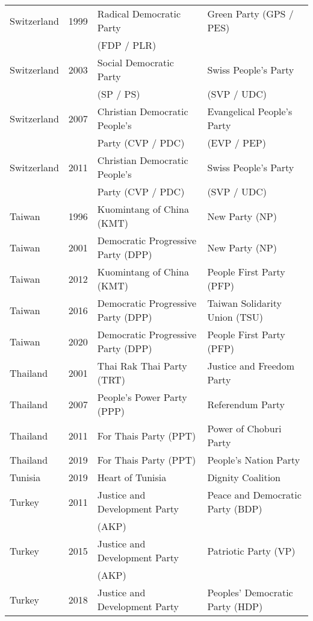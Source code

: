 {\begin{longtable}{|l|c|l|l|}
   Switzerland & 1999 &   Radical Democratic Party  &   Green Party (GPS / PES) \\ 
               &      &      (FDP / PLR)  &     \\ 
   Switzerland & 2003 &        Social Democratic Party &   Swiss People's Party  \\ 
               &      &     (SP / PS)     &    (SVP / UDC) \\ 
   Switzerland & 2007 &   Christian Democratic People's  &   Evangelical People's Party  \\ 
               &      &        Party (CVP / PDC) &    (EVP / PEP) \\ 
   Switzerland & 2011 &   Christian Democratic People's  &   Swiss People's Party \\ 
               &      &       Party (CVP / PDC)  &     (SVP / UDC) \\ 
   Taiwan & 1996 &   Kuomintang of China (KMT)  &   New Party (NP)   \\ 
   Taiwan & 2001 &   Democratic Progressive Party (DPP) &   New Party (NP)   \\ 
  Taiwan & 2012 &   Kuomintang of China (KMT)  &   People First Party (PFP)   \\ 
  Taiwan & 2016 &   Democratic Progressive Party (DPP) &   Taiwan Solidarity Union (TSU) \\ 
  Taiwan & 2020 &   Democratic Progressive Party (DPP) &   People First Party (PFP)   \\ 
  Thailand & 2001 &   Thai Rak Thai Party (TRT) &   Justice and Freedom Party \\ 
  Thailand & 2007 &   People's Power Party (PPP) &   Referendum Party  \\ 
  Thailand & 2011 &   For Thais Party (PPT) &   Power of Choburi Party \\ 
  Thailand & 2019 &   For Thais Party (PPT) &   People's Nation Party \\ 
  Tunisia & 2019 &   Heart of Tunisia &   Dignity Coalition \\ 
   Turkey & 2011 &   Justice and Development Party &   Peace and Democratic Party (BDP)   \\ 
               &      &       (AKP) &     \\ 
   Turkey & 2015 &   Justice and Development Party &   Patriotic Party (VP) \\ 
               &      &  (AKP)      &     \\ 
  Turkey & 2018 &   Justice and Development Party &   Peoples' Democratic Party (HDP)   \\ 

\end{longtable}}
